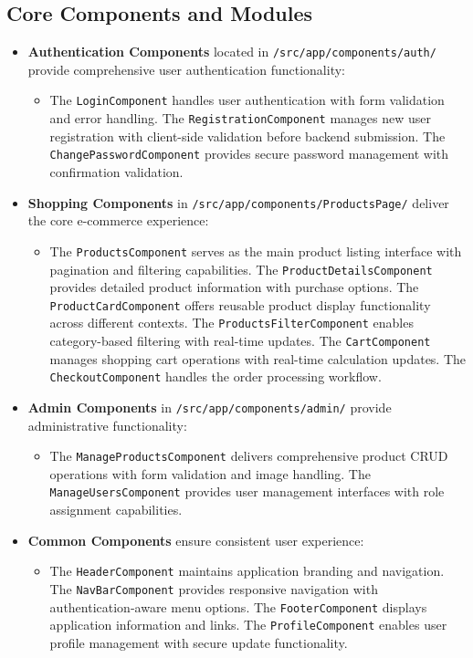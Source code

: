 \documentclass[12pt,a4paper]{article}
\begin{document}
\subsection{Core Components and Modules}

\begin{itemize}
    \item \textbf{Authentication Components} located in \texttt{/src/app/components/auth/} provide comprehensive user authentication functionality:
          \begin{itemize}
              \item The \texttt{LoginComponent} handles user authentication with form validation and error handling. The \texttt{RegistrationComponent} manages new user registration with client-side validation before backend submission. The \texttt{ChangePasswordComponent} provides secure password management with confirmation validation.
          \end{itemize}

    \item \textbf{Shopping Components} in \texttt{/src/app/components/ProductsPage/} deliver the core e-commerce experience:
          \begin{itemize}
              \item The \texttt{ProductsComponent} serves as the main product listing interface with pagination and filtering capabilities. The \texttt{ProductDetailsComponent} provides detailed product information with purchase options. The \texttt{ProductCardComponent} offers reusable product display functionality across different contexts. The \texttt{ProductsFilterComponent} enables category-based filtering with real-time updates. The \texttt{CartComponent} manages shopping cart operations with real-time calculation updates. The \texttt{CheckoutComponent} handles the order processing workflow.
          \end{itemize}
    \item \textbf{Admin Components} in \texttt{/src/app/components/admin/} provide administrative functionality:
          \begin{itemize}
              \item The \texttt{ManageProductsComponent} delivers comprehensive product CRUD operations with form validation and image handling. The \texttt{ManageUsersComponent} provides user management interfaces with role assignment capabilities.
          \end{itemize}
    \item \textbf{Common Components} ensure consistent user experience:
          \begin{itemize}
              \item The \texttt{HeaderComponent} maintains application branding and navigation. The \texttt{NavBarComponent} provides responsive navigation with authentication-aware menu options. The \texttt{FooterComponent} displays application information and links. The \texttt{ProfileComponent} enables user profile management with secure update functionality.
          \end{itemize}

\end{itemize}
\end{document}
